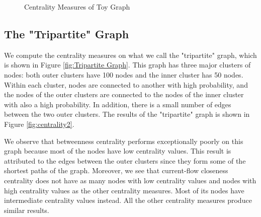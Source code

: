 \documentclass[10pt]{siamltex}
\begin{document}
\begin{pagewiselinenumbers}
\begin{figure}[ht]
{}
\caption{Centrality Measures of Toy Graph}
\label{fig:centrality1}
\end{figure}

\subsection{The "Tripartite" Graph}
We compute the centrality measures on what we call the "tripartite" graph, which is shown in Figure \ref{fig:Tripartite Graph}. This graph has three major clusters of nodes: both outer clusters have 100 nodes and the inner cluster has 50 nodes. Within each cluster, nodes are connected to another with high probability, and the nodes of the outer clusters are connected to the nodes of the inner cluster with also a high probability. In addition, there is a small number of edges between the two outer clusters. The results of the "tripartite" graph is shown in Figure \ref{fig:centrality2}.

We observe that betweenness centrality performs exceptionally poorly on this graph because most of the nodes have low centrality values. This result is attributed to the edges between the outer clusters since they form some of the shortest paths of the graph. Moreover, we see that current-flow closeness centrality does not have as many nodes with low centrality values and nodes with high centrality values as the other centrality measures. Most of its nodes have intermediate centrality values instead. All the other centrality measures produce similar results. 


\end{pagewiselinenumbers}
\end{document}
